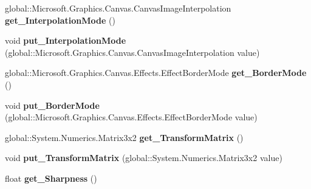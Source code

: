 \begin{DoxyCompactItemize}
global\+::\+Microsoft.\+Graphics.\+Canvas.\+Canvas\+Image\+Interpolation {\bfseries get\+\_\+\+Interpolation\+Mode} ()
\item 
\mbox{\label{class_microsoft_1_1_graphics_1_1_canvas_1_1_effects_1_1_transform2_d_effect_a7f4454ee99f14f9f2a19f8f9a7faf9f5}} 
void {\bfseries put\+\_\+\+Interpolation\+Mode} (global\+::\+Microsoft.\+Graphics.\+Canvas.\+Canvas\+Image\+Interpolation value)
\item 
\mbox{\label{class_microsoft_1_1_graphics_1_1_canvas_1_1_effects_1_1_transform2_d_effect_aba647ac3b58290db44c3c98ca8c19749}} 
global\+::\+Microsoft.\+Graphics.\+Canvas.\+Effects.\+Effect\+Border\+Mode {\bfseries get\+\_\+\+Border\+Mode} ()
\item 
\mbox{\label{class_microsoft_1_1_graphics_1_1_canvas_1_1_effects_1_1_transform2_d_effect_a3c44e6817302d293e5cd76726375a5e1}} 
void {\bfseries put\+\_\+\+Border\+Mode} (global\+::\+Microsoft.\+Graphics.\+Canvas.\+Effects.\+Effect\+Border\+Mode value)
\item 
\mbox{\label{class_microsoft_1_1_graphics_1_1_canvas_1_1_effects_1_1_transform2_d_effect_ac3153a849025ced8b89361d97104772b}} 
global\+::\+System.\+Numerics.\+Matrix3x2 {\bfseries get\+\_\+\+Transform\+Matrix} ()
\item 
\mbox{\label{class_microsoft_1_1_graphics_1_1_canvas_1_1_effects_1_1_transform2_d_effect_ab2dc992da27919ab922f3015532abe68}} 
void {\bfseries put\+\_\+\+Transform\+Matrix} (global\+::\+System.\+Numerics.\+Matrix3x2 value)
\item 
\mbox{\label{class_microsoft_1_1_graphics_1_1_canvas_1_1_effects_1_1_transform2_d_effect_aa820a4ea7ef6fe6bb2d75e16c55e2d44}} 
float {\bfseries get\+\_\+\+Sharpness} ()
\item 
\mbox{\label{class_microsoft_1_1_graphics_1_1_canvas_1_1_effects_1_1_transform2_d_effect_af157b24374215992f857b4060fe2ed79}} 

\end{DoxyCompactItemize}
